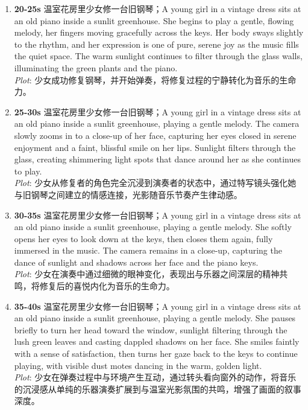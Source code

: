 \documentclass[11pt,a4paper]{article}
\begin{document}
\begin{enumerate}
\item \textbf{20-25s} 温室花房里少女修一台旧钢琴；A young girl in a vintage dress sits at an old piano inside a sunlit greenhouse. She begins to play a gentle, flowing melody, her fingers moving gracefully across the keys. Her body sways slightly to the rhythm, and her expression is one of pure, serene joy as the music fills the quiet space. The warm sunlight continues to filter through the glass walls, illuminating the green plants and the piano.\\\newline \textit{Plot}: 少女成功修复钢琴，并开始弹奏，将修复过程的宁静转化为音乐的生命力。
\item \textbf{25-30s} 温室花房里少女修一台旧钢琴；A young girl in a vintage dress sits at an old piano inside a sunlit greenhouse, playing a gentle melody. The camera slowly zooms in to a close-up of her face, capturing her eyes closed in serene enjoyment and a faint, blissful smile on her lips. Sunlight filters through the glass, creating shimmering light spots that dance around her as she continues to play.\\\newline \textit{Plot}: 少女从修复者的角色完全沉浸到演奏者的状态中，通过特写镜头强化她与旧钢琴之间建立的情感连接，光影随音乐节奏产生律动感。
\item \textbf{30-35s} 温室花房里少女修一台旧钢琴；A young girl in a vintage dress sits at an old piano inside a sunlit greenhouse, playing a gentle melody. She softly opens her eyes to look down at the keys, then closes them again, fully immersed in the music. The camera remains in a close-up, capturing the dance of sunlight and shadows across her face and the piano keys.\\\newline \textit{Plot}: 少女在演奏中通过细微的眼神变化，表现出与乐器之间深层的精神共鸣，将修复后的喜悦内化为音乐的生命力。
\item \textbf{35-40s} 温室花房里少女修一台旧钢琴；A young girl in a vintage dress sits at an old piano inside a sunlit greenhouse, playing a gentle melody. She pauses briefly to turn her head toward the window, sunlight filtering through the lush green leaves and casting dappled shadows on her face. She smiles faintly with a sense of satisfaction, then turns her gaze back to the keys to continue playing, with visible dust motes dancing in the warm, golden light.\\\newline \textit{Plot}: 少女在弹奏过程中与环境产生互动，通过转头看向窗外的动作，将音乐的沉浸感从单纯的乐器演奏扩展到与温室光影氛围的共鸣，增强了画面的叙事深度。

\end{enumerate}
\end{document}
